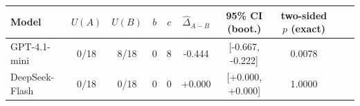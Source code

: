 \begin{tabular}{lccccccccc}
\toprule
Model & $U(A)$ & $U(B)$ & $b$ & $c$ & $\hat\Delta_{A-B}$ & 95\% CI (boot.) & two-sided $p$ (exact) \\
\midrule
GPT-4.1-mini & 0/18 & 8/18 & 0 & 8 & -0.444 & [-0.667, -0.222] & 0.0078 \\
DeepSeek-Flash & 0/18 & 0/18 & 0 & 0 & +0.000 & [+0.000, +0.000] & 1.0000 \\
\bottomrule
\end{tabular}
